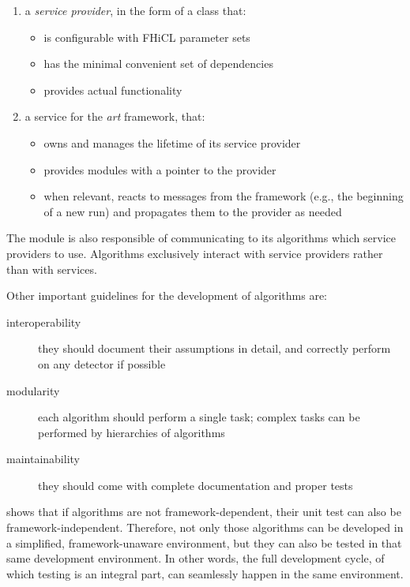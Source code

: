 \begin{enumerate}
   \item
      a \emph{service provider}, in the form of a class that:
      \begin{itemize}
         \item
            is configurable with FHiCL parameter sets
         \item
            has the minimal convenient set of dependencies
         \item
            provides actual functionality
      \end{itemize}
   \item
      a service for the \emph{art} framework, that:
      \begin{itemize}
         \item
            owns and manages the lifetime of its service provider
         \item
            provides modules with a pointer to the provider
         \item
            when relevant, reacts to messages from the framework (e.g., the
            beginning of a new run) and propagates them to the provider as needed
      \end{itemize}
\end{enumerate}
The module is also responsible of communicating to its algorithms which
service providers to use. Algorithms exclusively interact with service
providers rather than with \ART services.

Other important guidelines for the development of algorithms are:

\begin{description}
   \item[interoperability]
      they should document their assumptions in detail,
     and correctly perform on any detector if possible
   \item[modularity]
      each algorithm should perform a single task;
      complex tasks can be performed by hierarchies of algorithms
   \item[maintainability]
      they should come with complete documentation and proper tests
\end{description}

 shows that if algorithms are not
framework-dependent, their unit test can also be framework-independent.
Therefore, not only those algorithms can be developed in a simplified,
framework-unaware environment, but they can also be tested in that same
development environment. In other words, the full development cycle, of
which testing is an integral part, can seamlessly happen in the same
environment.


